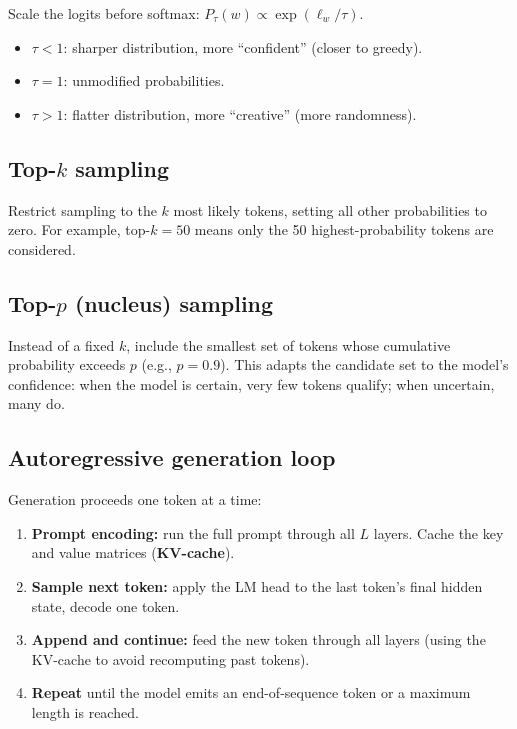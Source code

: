 \documentclass[11pt, twoside, openright]{memoir}
\begin{document}
Scale the logits before softmax:
$P_\tau(w) \propto \exp(\ell_w / \tau)$.
\begin{itemize}[nosep]
\item $\tau < 1$: sharper distribution, more ``confident'' (closer to greedy).
\item $\tau = 1$: unmodified probabilities.
\item $\tau > 1$: flatter distribution, more ``creative'' (more randomness).
\end{itemize}

\subsection{Top-$k$ sampling}

Restrict sampling to the $k$ most likely tokens, setting all other
probabilities to zero.  For example, top-$k = 50$ means only the 50
highest-probability tokens are considered.

\subsection{Top-$p$ (nucleus) sampling}

Instead of a fixed $k$, include the smallest set of tokens whose cumulative
probability exceeds $p$ (e.g., $p = 0.9$).  This adapts the candidate set
to the model's confidence: when the model is certain, very few tokens
qualify; when uncertain, many do.

\subsection{Autoregressive generation loop}

Generation proceeds one token at a time:
\begin{enumerate}[nosep]
\item \textbf{Prompt encoding:} run the full prompt through all $L$ layers.
  Cache the key and value matrices (\textbf{KV-cache}).
\item \textbf{Sample next token:} apply the LM head to the last token's
  final hidden state, decode one token.
\item \textbf{Append and continue:} feed the new token through all layers
  (using the KV-cache to avoid recomputing past tokens).
\item \textbf{Repeat} until the model emits an end-of-sequence token or
  a maximum length is reached.
\end{enumerate}
\end{document}
